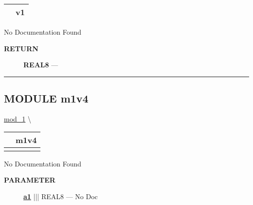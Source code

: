 {\renewcommand{\arraystretch}{1.5}
\begin{tabularx}{\textwidth}{|>{\raggedright\arraybackslash}l|X|}
\hline
\hspace{0pt}\mytexttt{\color{red} } & \textbf{v1} \\
\hline
\end{tabularx}
}

\par





No Documentation Found








\par
\begin{description}
\item [\colorbox{tagtype}{\color{white} \textbf{\textsf{RETURN}}}] \textbf{REAL8} --- 
\end{description}




\rule{\linewidth}{0.5pt}
\subsection*{\textsf{\colorbox{headtoc}{\color{white} MODULE}
m1v4}}

\hypertarget{ecldoc:mod_1.m1v4}{}
\hspace{0pt} \hyperlink{ecldoc:mod_1}{mod_1} \textbackslash 

{\renewcommand{\arraystretch}{1.5}
\begin{tabularx}{\textwidth}{|>{\raggedright\arraybackslash}l|X|}
\hline
\hspace{0pt}\mytexttt{\color{red} } & \textbf{m1v4} \\
\hline
\multicolumn{2}{|>{\raggedright\arraybackslash}X|}{\hspace{0pt}\mytexttt{\color{param} (REAL8 a1)}} \\
\hline
\end{tabularx}
}

\par





No Documentation Found






\par
\begin{description}
\item [\colorbox{tagtype}{\color{white} \textbf{\textsf{PARAMETER}}}] \textbf{\underline{a1}} ||| REAL8 --- No Doc
\end{description}






